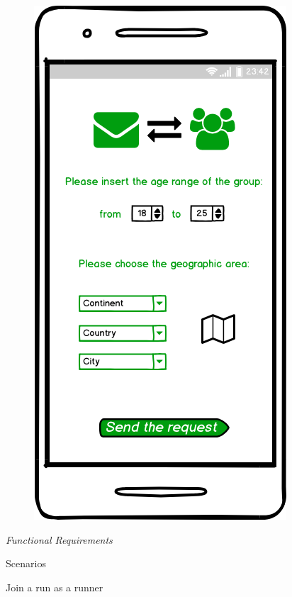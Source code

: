 \documentclass{article}
\begin{document}
\begin{legal}
\begin{legal}
\begin{legal}
{\begin{legal}
\begin{figure}[H]
  						\includegraphics[scale=0.3]{./images/mockups/Group-request.png}
						\end{figure}
						
				\end{legal}
				}
			\end{legal}

    		\item \textit{Functional Requirements}\\
    		\begin{legal}
		\item Scenarios\\
		{\normalfont
		\begin{legal}
		\item Join a run as a runner\\


\end{legal}}
\end{legal}
\end{legal}
\end{legal}
\end{document}
